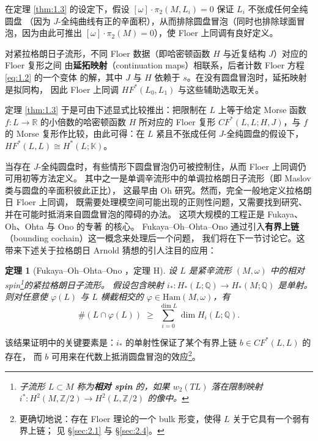 \documentclass[UTF8,a4paper,11pt,fontset=windows]{ctexart}
\theoremstyle{cnthm}
\newtheorem{thm}{定理}[section]
\numberwithin{equation}{section}
\newcommand{\R}{\mathbb{R}}
\newcommand{\Z}{\mathbb{Z}}
\newcommand{\Q}{\mathbb{Q}}
\newcommand{\KK}{\mathbb{K}}          %
\newcommand{\CF}{CF}                  %
\newcommand{\HF}{HF}                  %
\begin{document}
在定理 \ref{thm:1.3} 的设定下，假设 $[\omega]\cdot\pi_2(M,L_i)=0$ 保证 $L_i$ 不张成任何全纯圆盘
（因为 $J$-全纯曲线有正的辛面积），从而排除圆盘冒泡（同时也排除球面冒泡，因为由此可推出
$[\omega]\cdot\pi_2(M)=0$），使 Floer 上同调有良好定义。

对紧拉格朗日子流形，不同 Floer 数据（即哈密顿函数 $H$ 与近复结构 $J$）对应的 Floer 复形之间
由\textbf{延拓映射}（continuation maps）相联系，后者计数 Floer 方程 \eqref{eq:1.2} 的一个变体
的解，其中 $J$ 与 $H$ 依赖于 $s$。在没有圆盘冒泡时，延拓映射是拟同构，
因此 Floer 上同调 $\HF^{*}(L_0,L_1)$ 与这些辅助选取无关。

定理 \ref{thm:1.3} 于是可由下述显式比较推出：把限制在 $L$ 上等于给定 Morse 函数
$f:L\to\R$ 的小倍数的哈密顿函数 $H$ 所对应的 Floer 复形 $\CF^{*}(L,L;H,J)$，与 $f$ 的
Morse 复形作比较，由此可得：在 $L$ 紧且不张成任何 $J$-全纯圆盘的假设下，
$\HF^{*}(L,L)\cong H^{*}(L;\KK)$。

当存在 $J$-全纯圆盘时，有些情形下圆盘冒泡仍可被控制住，从而 Floer 上同调仍可用初等方法定义。
其中之一是单调辛流形中的单调拉格朗日子流形（即 Maslov 类与圆盘的辛面积彼此正比），
这最早由 Oh \cite{r79} 研究。然而，完全一般地定义拉格朗日 Floer 上同调，
既需要处理模空间可能出现的正则性问题，又需要找到研究、并在可能时抵消来自圆盘冒泡的障碍的办法。
这项大规模的工程正是 Fukaya、Oh、Ohta 与 Ono 的专著 \cite{r44} 的核心。
Fukaya--Oh--Ohta--Ono 通过引入\textbf{有界上链}（bounding cochain）这一概念来处理后一个问题，
我们将在下一节讨论它。这带来下述关于拉格朗日 Arnold 猜想的引人注目的应用：

\begin{thm}[Fukaya--Oh--Ohta--Ono \cite{r44}，定理 H]\label{thm:1.4}
设 $L$ 是紧辛流形 $(M,\omega)$ 中的相对 spin\footnote{%
子流形 $L\subset M$ 称为\textbf{相对 spin} 的，如果 $w_2(TL)$ 落在限制映射
$i^{*}:H^{2}(M,\Z/2)\to H^{2}(L,\Z/2)$ 的像中。}的紧拉格朗日子流形。
假设包含映射 $i_{*}:H_{*}(L;\Q)\to H_{*}(M;\Q)$ 是单射。
则对任意使 $\varphi(L)$ 与 $L$ 横截相交的 $\varphi\in\mathrm{Ham}(M,\omega)$，有
\[
\#(L\cap\varphi(L))\;\ge\;\sum_{i=0}^{\dim L}\dim H_i(L;\Q).
\]
\end{thm}

该结果证明中的关键要素是：$i_{*}$ 的单射性保证了某个有界上链 $b\in\CF^{*}(L,L)$ 的存在，
而 $b$ 可用来在代数上抵消圆盘冒泡的效应\footnote{%
更确切地说：存在 Floer 理论的一个 bulk 形变，使得 $L$ 关于它具有一个弱有界上链；
见 \S\ref{sec:2.1} 与 \S\ref{sec:2.4}。}。

\end{document}
